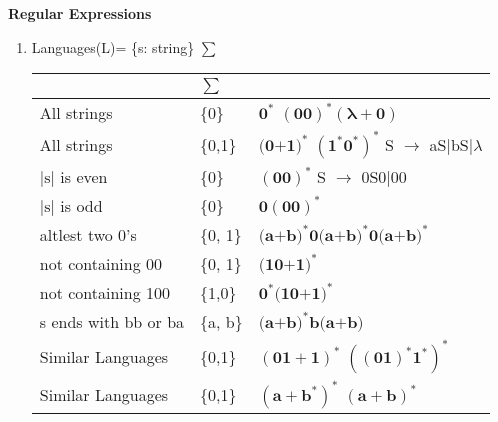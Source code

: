 
\centerline{\textbf{ \LARGE Regular Expressions }}

\begin{enumerate}
    \item Languages(L)= \{s: string\} \(\sum\)

    \begin{myTableStyle} \begin{tabular}{ |m{4cm}|m{1cm}|m{10cm}| } \hline
        & \(\sum\) & \\ \hline
        All strings  &\{0\}
                     & \( \mathbf {0^*} \)  \quad \( \mathbf {(00)^*(\lambda+0)} \)  \\ \hline

        All strings &\{0,1\}
                    & \( \mathbf {\text{(0+1)}^*} \) \;  \( \mathbf { (\text{1}^*\text{0}^*)^*} \)
                    \quad S \(\rightarrow\) aS\(|\)bS\(| \lambda \) \\ \hline

         \(\left |\text{s}\right | \)  is even & \{0\}
                        &  \( \mathbf {(00)^*} \) \quad S \(\rightarrow\) 0S0\(|\)00 \\ \hline

        \(   \left | \text{s}  \right | \)  is odd & \{0\} &  \( \mathbf {0(00)^*} \) \\ \hline

        altlest two 0's & \{0, 1\}
                & \( \mathbf { \text{(a+b)}^* \text{0} \text{(a+b)}^* \text{0} \text{(a+b)}^*} \) \\ \hline

        not containing 00 & \{0, 1\} &  \( \mathbf { \text{(10+1)}^* } \)  \\ \hline

        not containing 100 & \{1,0\}
                                      & \( \mathbf { \text{0}^*\text{(10+1)}^* } \) \\\hline

        s ends with bb or ba & \{a, b\}
                             & \( \mathbf { \text{(a+b)}^* \text{b} \text{(a+b)} } \)  \\\hline

        Similar Languages  &\{0,1\}
                           & \( \mathbf {(01 + 1)^*} \) \quad \( \mathbf {((01)^*1^*)^*} \) \\ \hline

        Similar Languages  &\{0,1\}
                           & \( \mathbf {(a + b^*)^*} \) \quad \( \mathbf {(a+b)^*} \) \\ \hline


\end{tabular}
\end{myTableStyle}
\end{enumerate}
